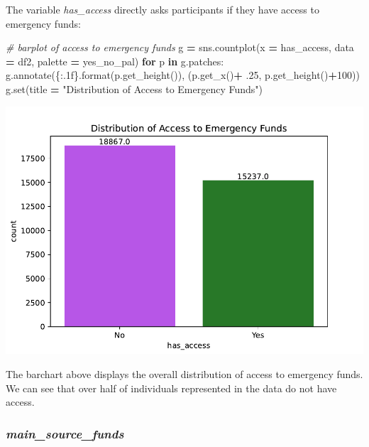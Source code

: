 \documentclass[water,article,submit,moreauthors,pdftex]{mdpi}
\newenvironment{Shaded}{\begin{snugshade}}{\end{snugshade}}
\newcommand{\BuiltInTok}[1]{#1}
\newcommand{\CommentTok}[1]{\textcolor[rgb]{0.56,0.35,0.01}{\textit{#1}}}
\newcommand{\ControlFlowTok}[1]{\textcolor[rgb]{0.13,0.29,0.53}{\textbf{#1}}}
\newcommand{\DecValTok}[1]{\textcolor[rgb]{0.00,0.00,0.81}{#1}}
\newcommand{\FloatTok}[1]{\textcolor[rgb]{0.00,0.00,0.81}{#1}}
\newcommand{\KeywordTok}[1]{\textcolor[rgb]{0.13,0.29,0.53}{\textbf{#1}}}
\newcommand{\NormalTok}[1]{#1}
\newcommand{\OperatorTok}[1]{\textcolor[rgb]{0.81,0.36,0.00}{\textbf{#1}}}
\newcommand{\SpecialCharTok}[1]{\textcolor[rgb]{0.00,0.00,0.00}{#1}}
\newcommand{\StringTok}[1]{\textcolor[rgb]{0.31,0.60,0.02}{#1}}
\begin{document}
The variable \emph{has\_access} directly asks participants if they have
access to emergency funds:

\begin{Shaded}
\begin{Highlighting}[]
\CommentTok{\# barplot of access to emergency funds}
\NormalTok{g }\OperatorTok{=}\NormalTok{ sns.countplot(x }\OperatorTok{=} \StringTok{\textquotesingle{}has\_access\textquotesingle{}}\NormalTok{, data }\OperatorTok{=}\NormalTok{ df2, palette }\OperatorTok{=}\NormalTok{ yes\_no\_pal)}
\ControlFlowTok{for}\NormalTok{ p }\KeywordTok{in}\NormalTok{ g.patches:}
\NormalTok{   g.annotate(}\StringTok{\textquotesingle{}}\SpecialCharTok{\{:.1f\}}\StringTok{\textquotesingle{}}\NormalTok{.}\BuiltInTok{format}\NormalTok{(p.get\_height()), (p.get\_x()}\OperatorTok{+} \FloatTok{.25}\NormalTok{, p.get\_height()}\OperatorTok{+}\DecValTok{100}\NormalTok{))}
\NormalTok{g.}\BuiltInTok{set}\NormalTok{(title }\OperatorTok{=} \StringTok{"Distribution of Access to Emergency Funds"}\NormalTok{)}
\end{Highlighting}
\end{Shaded}

\includegraphics{term_paper_files/figure-latex/unnamed-chunk-14-11.pdf}

The barchart above displays the overall distribution of access to
emergency funds. We can see that over half of individuals represented in
the data do not have access.

\hypertarget{main_source_funds}{%
\subsubsection{\texorpdfstring{\emph{main\_source\_funds}}{main\_source\_funds}}\label{main_source_funds}}
\end{document}
